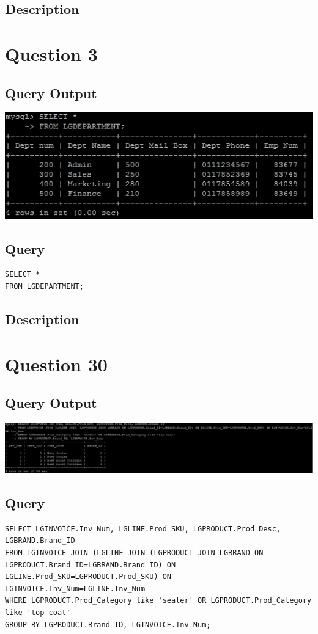 \documentclass[a4paper,10pt]{article}
\begin{document}
\subsection{Description}
\section*{Question 3}
\subsection{Query Output}
           \includegraphics{Queries/Question_3/Q3_screenshot.jpg}
 \subsection{Query}
          \lstset{
            language=SQL,
            breaklines=true
            }
        \begin{lstlisting}[frame=single]
        SELECT *
FROM LGDEPARTMENT;

        \end{lstlisting}
\subsection{Description}
\section*{Question 30}
\subsection{Query Output}
           \includegraphics{Queries/Question_30/Q30_screenshot.jpg}
 \subsection{Query}
          \lstset{
            language=SQL,
            breaklines=true
            }
        \begin{lstlisting}[frame=single]
        SELECT LGINVOICE.Inv_Num, LGLINE.Prod_SKU, LGPRODUCT.Prod_Desc, LGBRAND.Brand_ID
FROM LGINVOICE JOIN (LGLINE JOIN (LGPRODUCT JOIN LGBRAND ON LGPRODUCT.Brand_ID=LGBRAND.Brand_ID) ON LGLINE.Prod_SKU=LGPRODUCT.Prod_SKU) ON LGINVOICE.Inv_Num=LGLINE.Inv_Num
WHERE LGPRODUCT.Prod_Category like 'sealer' OR LGPRODUCT.Prod_Category like 'top coat'
GROUP BY LGPRODUCT.Brand_ID, LGINVOICE.Inv_Num;
        \end{lstlisting}
\end{document}
